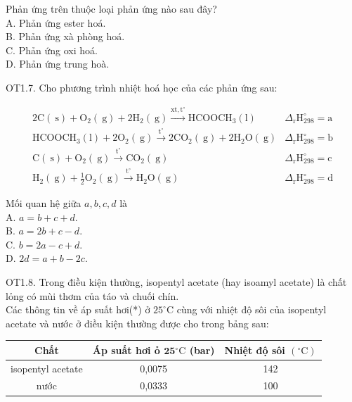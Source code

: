 \documentclass[10pt]{article}
\begin{document}
Phản ứng trên thuộc loại phản ứng nào sau đây?\\
A. Phản ứng ester hoá.\\
B. Phản ứng xà phòng hoá.\\
C. Phản ứng oxi hoá.\\
D. Phản ứng trung hoà.

OT1.7. Cho phương trình nhiệt hoá học của các phản ứng sau:

$$
\begin{array}{ll}
2 \mathrm{C}(\mathrm{~s})+\mathrm{O}_{2}(\mathrm{~g})+2 \mathrm{H}_{2}(\mathrm{~g}) \xrightarrow{\mathrm{xt}, \mathrm{t}^{\circ}} \mathrm{HCOOCH}_{3}(\mathrm{l}) & \Delta_{\mathrm{r}} \mathrm{H}_{298}^{\circ}=\mathrm{a} \\
\mathrm{HCOOCH}_{3}(\mathrm{l})+2 \mathrm{O}_{2}(\mathrm{~g}) \xrightarrow{\mathrm{t}^{\circ}} 2 \mathrm{CO}_{2}(\mathrm{~g})+2 \mathrm{H}_{2} \mathrm{O}(\mathrm{~g}) & \Delta_{\mathrm{r}} \mathrm{H}_{298}^{\circ}=\mathrm{b} \\
\mathrm{C}(\mathrm{~s})+\mathrm{O}_{2}(\mathrm{~g}) \xrightarrow{\mathrm{t}^{\circ}} \mathrm{CO}_{2}(\mathrm{~g}) & \Delta_{\mathrm{r}} \mathrm{H}_{298}^{\circ}=\mathrm{c} \\
\mathrm{H}_{2}(\mathrm{~g})+\frac{1}{2} \mathrm{O}_{2}(\mathrm{~g}) \xrightarrow{\mathrm{t}^{\circ}} \mathrm{H}_{2} \mathrm{O}(\mathrm{~g}) & \Delta_{\mathrm{r}} \mathrm{H}_{298}^{\circ}=\mathrm{d}
\end{array}
$$

Mối quan hệ giữa $a, b, c, d$ là\\
A. $a=b+c+d$.\\
B. $a=2 b+c-d$.\\
C. $b=2 a-c+d$.\\
D. $2 d=a+b-2 c$.

OT1.8. Trong điều kiện thường, isopentyl acetate (hay isoamyl acetate) là chất lỏng có mùi thơm của táo và chuối chín.\\
Các thông tin về áp suất hơi(*) ở $25^{\circ} \mathrm{C}$ cùng với nhiệt độ sôi của isopentyl acetate và nước ở điều kiện thường được cho trong bảng sau:

\begin{center}
\begin{tabular}{|c|c|c|}
\hline
Chất & Áp suất hơi ỏ $\mathbf{2 5}{ }^{\circ} \mathrm{C}$ (bar) & Nhiệt độ sôi $\left({ }^{\circ} \mathrm{C}\right)$ \\
\hline
isopentyl acetate & 0,0075 & 142 \\
\hline
nước & 0,0333 & 100 \\
\hline
\end{tabular}
\end{center}
\end{document}
